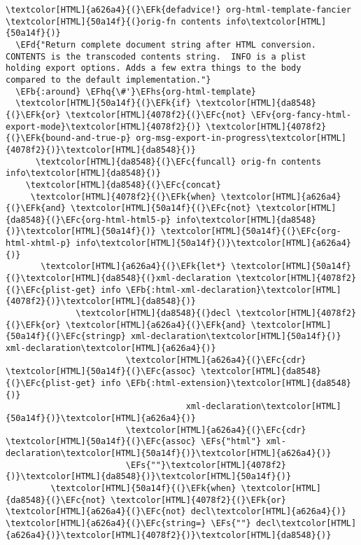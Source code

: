 \documentclass{scrartcl}
\newcommand{\EFk}[1]{\textcolor{EFk}{#1}} %
\newcommand{\EFd}[1]{\textcolor{EFd}{\textit{#1}}} %
\newcommand{\EFs}[1]{\textcolor{EFs}{#1}} %
\newcommand{\EFb}[1]{\textcolor{EFb}{#1}} %
\newcommand{\EFc}[1]{\textcolor{EFc}{#1}} %
\newcommand{\EFv}[1]{\textcolor{EFv}{#1}} %
\newcommand{\EFhq}[1]{\textcolor{EFhq}{#1}} %
\newcommand{\EFhs}[1]{\textcolor{EFhs}{#1}} %
\begin{document}
\begin{Code}
\begin{Verbatim}[]
\textcolor[HTML]{a626a4}{(}\EFk{defadvice!} org-html-template-fancier \textcolor[HTML]{50a14f}{(}orig-fn contents info\textcolor[HTML]{50a14f}{)}
  \EFd{"Return complete document string after HTML conversion.
CONTENTS is the transcoded contents string.  INFO is a plist
holding export options. Adds a few extra things to the body
compared to the default implementation."}
  \EFb{:around} \EFhq{\#'}\EFhs{org-html-template}
  \textcolor[HTML]{50a14f}{(}\EFk{if} \textcolor[HTML]{da8548}{(}\EFk{or} \textcolor[HTML]{4078f2}{(}\EFc{not} \EFv{org-fancy-html-export-mode}\textcolor[HTML]{4078f2}{)} \textcolor[HTML]{4078f2}{(}\EFk{bound-and-true-p} org-msg-export-in-progress\textcolor[HTML]{4078f2}{)}\textcolor[HTML]{da8548}{)}
      \textcolor[HTML]{da8548}{(}\EFc{funcall} orig-fn contents info\textcolor[HTML]{da8548}{)}
    \textcolor[HTML]{da8548}{(}\EFc{concat}
     \textcolor[HTML]{4078f2}{(}\EFk{when} \textcolor[HTML]{a626a4}{(}\EFk{and} \textcolor[HTML]{50a14f}{(}\EFc{not} \textcolor[HTML]{da8548}{(}\EFc{org-html-html5-p} info\textcolor[HTML]{da8548}{)}\textcolor[HTML]{50a14f}{)} \textcolor[HTML]{50a14f}{(}\EFc{org-html-xhtml-p} info\textcolor[HTML]{50a14f}{)}\textcolor[HTML]{a626a4}{)}
       \textcolor[HTML]{a626a4}{(}\EFk{let*} \textcolor[HTML]{50a14f}{(}\textcolor[HTML]{da8548}{(}xml-declaration \textcolor[HTML]{4078f2}{(}\EFc{plist-get} info \EFb{:html-xml-declaration}\textcolor[HTML]{4078f2}{)}\textcolor[HTML]{da8548}{)}
              \textcolor[HTML]{da8548}{(}decl \textcolor[HTML]{4078f2}{(}\EFk{or} \textcolor[HTML]{a626a4}{(}\EFk{and} \textcolor[HTML]{50a14f}{(}\EFc{stringp} xml-declaration\textcolor[HTML]{50a14f}{)} xml-declaration\textcolor[HTML]{a626a4}{)}
                        \textcolor[HTML]{a626a4}{(}\EFc{cdr} \textcolor[HTML]{50a14f}{(}\EFc{assoc} \textcolor[HTML]{da8548}{(}\EFc{plist-get} info \EFb{:html-extension}\textcolor[HTML]{da8548}{)}
                                    xml-declaration\textcolor[HTML]{50a14f}{)}\textcolor[HTML]{a626a4}{)}
                        \textcolor[HTML]{a626a4}{(}\EFc{cdr} \textcolor[HTML]{50a14f}{(}\EFc{assoc} \EFs{"html"} xml-declaration\textcolor[HTML]{50a14f}{)}\textcolor[HTML]{a626a4}{)}
                        \EFs{""}\textcolor[HTML]{4078f2}{)}\textcolor[HTML]{da8548}{)}\textcolor[HTML]{50a14f}{)}
         \textcolor[HTML]{50a14f}{(}\EFk{when} \textcolor[HTML]{da8548}{(}\EFc{not} \textcolor[HTML]{4078f2}{(}\EFk{or} \textcolor[HTML]{a626a4}{(}\EFc{not} decl\textcolor[HTML]{a626a4}{)} \textcolor[HTML]{a626a4}{(}\EFc{string=} \EFs{""} decl\textcolor[HTML]{a626a4}{)}\textcolor[HTML]{4078f2}{)}\textcolor[HTML]{da8548}{)}

\end{Verbatim}
\end{Code}
\end{document}
